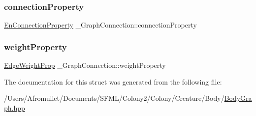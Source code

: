 \mbox{\label{struct___graph_connection_ab4f55b760335b06eb893f9abded06939}} 
\subsubsection{\texorpdfstring{connection\+Property}{connectionProperty}}
{\footnotesize\ttfamily \mbox{\hyperlink{_body_graph_8hpp_aaf075ead75a7b8171312447a8e13aab8}{En\+Connection\+Property}} \+\_\+\+Graph\+Connection\+::connection\+Property}

\mbox{\label{struct___graph_connection_a243a1a161c39bafe16a580f2fca162d1}} 
\subsubsection{\texorpdfstring{weight\+Property}{weightProperty}}
{\footnotesize\ttfamily \mbox{\hyperlink{_body_graph_8hpp_aca4f327513ae6b3eeddfb5d9ccff4eb7}{Edge\+Weight\+Prop}} \+\_\+\+Graph\+Connection\+::weight\+Property}



The documentation for this struct was generated from the following file\+:\begin{DoxyCompactItemize}
\item 
/\+Users/\+Afromullet/\+Documents/\+S\+F\+M\+L/\+Colony2/\+Colony/\+Creature/\+Body/\mbox{\hyperlink{_body_graph_8hpp}{Body\+Graph.\+hpp}}\end{DoxyCompactItemize}
